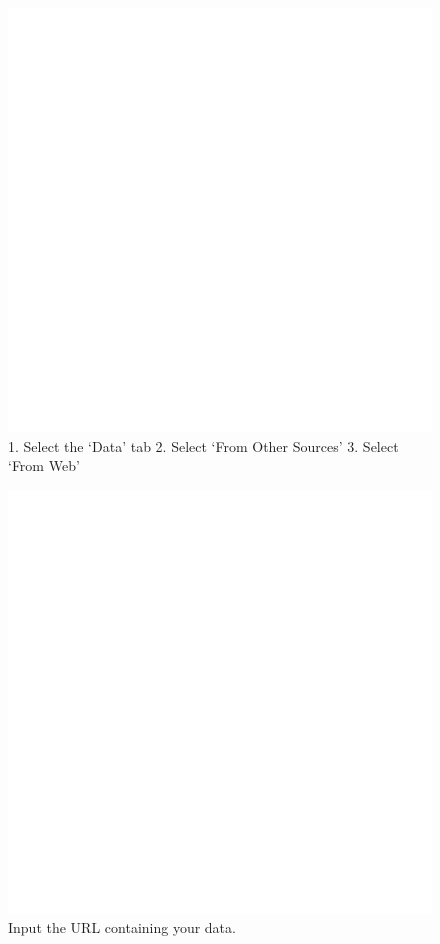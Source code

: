 \documentclass[
  11,
]{book}
\begin{document}
\begin{figure}
\centering
\includegraphics{_book/_main_files/images/Excel_Query_Guide.png}
\caption{\label{fig:image1}1. Select the `Data' tab 2. Select `From Other Sources' 3. Select `From Web'}
\end{figure}

\begin{figure}
\centering
\includegraphics{_book/_main_files/images/url_input.png}
\caption{\label{fig:image2}Input the URL containing your data.}
\end{figure}
\end{document}
